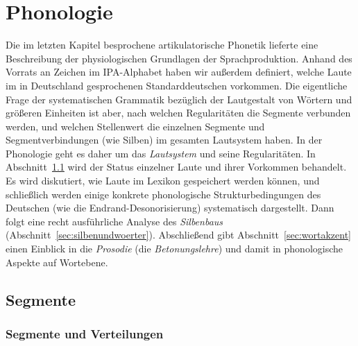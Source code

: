 \chapter{Phonologie}
\label{sec:phonologie}

Die im letzten Kapitel besprochene artikulatorische Phonetik lieferte eine Beschreibung der physiologischen Grundlagen der Sprachproduktion.
Anhand des Vorrats an Zeichen im IPA-Alphabet haben wir außerdem definiert, welche Laute im in Deutschland gesprochenen Standarddeutschen vorkommen.
Die eigentliche Frage der systematischen Grammatik bezüglich der Lautgestalt von Wörtern und größeren Einheiten ist aber, nach welchen Regularitäten die Segmente verbunden werden, und welchen Stellenwert die einzelnen Segmente und Segmentverbindungen (wie \zB Silben) im gesamten Lautsystem haben.
In der Phonologie geht es daher um das \textit{Lautsystem} und seine Regularitäten.
In Abschnitt~\ref{sec:segmente} wird der Status einzelner Laute und ihrer Vorkommen behandelt.
Es wird diskutiert, wie Laute im Lexikon gespeichert werden können, und schließlich werden einige konkrete phonologische Strukturbedingungen des Deutschen (wie die Endrand-Desonorisierung) systematisch dargestellt.
Dann folgt eine recht ausführliche Analyse des \textit{Silbenbaus} (Abschnitt~\ref{sec:silbenundwoerter}).
Abschließend gibt Abschnitt~\ref{sec:wortakzent} einen Einblick in die \textit{Prosodie} (die \textit{Betonungslehre}) und damit in phonologische Aspekte auf Wortebene.

\section{Segmente}
\label{sec:segmente}

\subsection{Segmente und Verteilungen}
\label{sec:segmenteundverteilungen}

